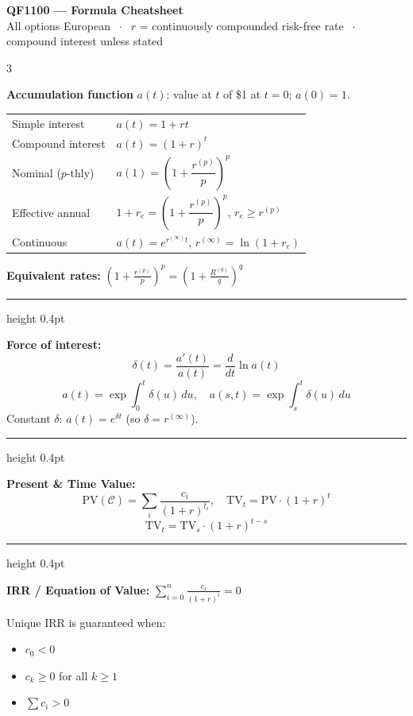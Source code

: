 \documentclass[9pt, a4paper, landscape]{extarticle}
\newcommand{\chbox}[2]{%
  \begin{tcolorbox}[sheet, title={\bfseries\small #1}]
  #2
  \end{tcolorbox}%
}
\newcommand{\boxrule}{\vspace{3pt}\textcolor{ruleclr}{\hrule height 0.4pt}\vspace{3pt}}
\begin{document}
\begin{center}
  {\large\bfseries QF1100 --- Formula Cheatsheet}\\[2pt]
  {\small\color{hmed}All options European $\;\cdot\;$
   $r$ = continuously compounded risk-free rate $\;\cdot\;$
   compound interest unless stated}
\end{center}
\vspace{2pt}

\begin{multicols}{3}

\chbox{Chapter 1 --- Theory of Interest}{

\textbf{Accumulation function} $a(t)$: value at $t$ of \$1 at $t=0$;\; $a(0)=1$.

\smallskip
\begin{tabular}{@{}ll@{}}
  Simple interest    & $a(t)=1+rt$ \\[2pt]
  Compound interest  & $a(t)=(1+r)^{t}$ \\[2pt]
  Nominal ($p$-thly) & $a(1)=\!\left(1+\dfrac{r^{(p)}}{p}\right)^{\!p}$ \\[6pt]
  Effective annual   & $1+r_e=\!\left(1+\dfrac{r^{(p)}}{p}\right)^{\!p}$,\; $r_e\ge r^{(p)}$ \\[6pt]
  Continuous         & $a(t)=e^{r^{(\infty)}t}$,\; $r^{(\infty)}=\ln(1+r_e)$ \\
\end{tabular}

\smallskip
\textbf{Equivalent rates:}
$\displaystyle\left(1+\frac{r^{(p)}}{p}\right)^{p}=\left(1+\frac{R^{(q)}}{q}\right)^{q}$

\boxrule

\textbf{Force of interest:}
\[
\delta(t)=\frac{a'(t)}{a(t)}=\frac{d}{dt}\ln a(t)
\]
\[
a(t)=\exp\!\int_0^t\!\delta(u)\,du,\quad
a(s,t)=\exp\!\int_s^t\!\delta(u)\,du
\]
Constant $\delta$: $a(t)=e^{\delta t}$ (so $\delta=r^{(\infty)}$).

\boxrule

\textbf{Present \& Time Value:}
\[
\mathrm{PV}(\mathcal{C})=\sum_i\frac{c_i}{(1+r)^{t_i}},\quad
\mathrm{TV}_t=\mathrm{PV}\cdot(1+r)^t
\]
\[\mathrm{TV}_t=\mathrm{TV}_s\cdot(1+r)^{t-s}\]

\boxrule

\textbf{IRR / Equation of Value:}\;
$\displaystyle\sum_{i=0}^n\frac{c_i}{(1+r)^i}=0$

Unique IRR is guaranteed when:
\begin{itemize}
  \item $c_0 < 0$
  \item $c_k \ge 0$ for all $k \ge 1$
  \item $\sum c_i > 0$
\end{itemize}

}
\end{multicols}
\end{document}
